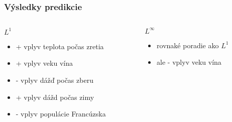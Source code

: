\documentclass[presentation.tex]{subfiles}
\begin{document}
	
	\begin{frame}
		\frametitle{Výsledky predikcie}
		\begin{columns}[t]
			\begin{column}{0.5\textwidth}
				\textbf{$L^1$}
				\begin{itemize}
					\item + vplyv teplota počas zretia
					\item + vplyv veku vína
					\item - vplyv dážď počas zberu
					\item + vplyv dážd počas zimy
					\item - vplyv populácie Francúzska 
					
				\end{itemize}
			\end{column}
			
			\begin{column}{0.5\textwidth}
				\textbf{$L^{\infty}$}
				\begin{itemize}
					\item rovnaké poradie ako \textbf{$L^1$}
					\item ale - vplyv veku vína
				\end{itemize}
			\end{column}
			
		\end{columns}
		
		
	
		
		
	\end{frame}
	
\end{document}
